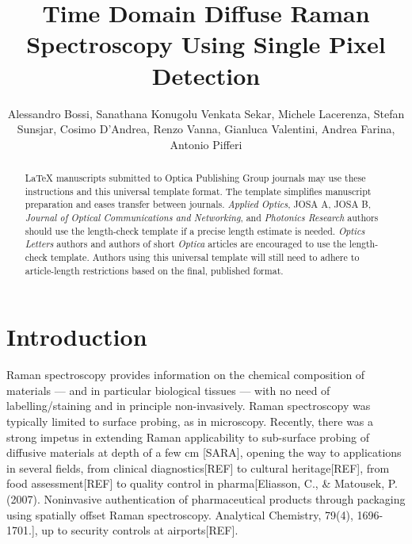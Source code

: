\documentclass{osa-article}
\begin{document}
\title{Time Domain Diffuse Raman Spectroscopy Using Single Pixel Detection}

\author{Alessandro Bossi, Sanathana Konugolu Venkata Sekar, Michele Lacerenza,  Stefan Sunsjar,   Cosimo D’Andrea, Renzo Vanna, Gianluca Valentini, Andrea Farina, Antonio Pifferi  }

\address{Politecnico di Milano\\
Sanatana\\
CNR}




\begin{abstract}
\LaTeX{} manuscripts submitted to Optica Publishing Group journals may use these instructions and this universal template format. The template simplifies manuscript preparation and eases transfer between journals. \emph{Applied Optics}, JOSA A, JOSA B, \emph{Journal of Optical Communications and Networking}, and \emph{Photonics Research} authors should use the length-check template if a precise length estimate is needed. \emph{Optics Letters} authors and authors of short \emph{Optica} articles are encouraged to use the length-check template. Authors using this universal template will still need to adhere to article-length restrictions based on the final, published format.
\end{abstract}

\section{Introduction}
Raman spectroscopy provides information on the chemical composition of materials --- and in particular biological tissues --- with no need of labelling/staining and in principle non-invasively. Raman spectroscopy was typically limited to surface probing, as in microscopy. Recently, there was a strong impetus in extending Raman applicability to sub-surface probing of diffusive materials at depth of a few cm [SARA], opening the way to applications in several fields, from clinical diagnostics[REF] to cultural heritage[REF], from food assessment[REF] to quality control in pharma[Eliasson, C., & Matousek, P. (2007). Noninvasive authentication of pharmaceutical products through packaging using spatially offset Raman spectroscopy. Analytical Chemistry, 79(4), 1696-1701.], up to security controls at airports[REF].
\end{document}
